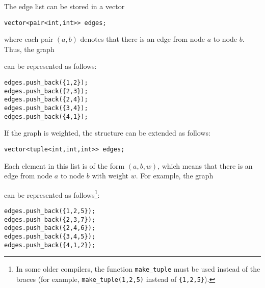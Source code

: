The edge list can be stored in a vector
\begin{lstlisting}
vector<pair<int,int>> edges;
\end{lstlisting}
where each pair $(a,b)$ denotes that
there is an edge from node $a$ to node $b$.
Thus, the graph

\begin{center}
\end{center}
can be represented as follows:
\begin{lstlisting}
edges.push_back({1,2});
edges.push_back({2,3});
edges.push_back({2,4});
edges.push_back({3,4});
edges.push_back({4,1});
\end{lstlisting}

\noindent
If the graph is weighted, the structure can
be extended as follows:
\begin{lstlisting}
vector<tuple<int,int,int>> edges;
\end{lstlisting}
Each element in this list is of the
form $(a,b,w)$, which means that there
is an edge from node $a$ to node $b$ with weight $w$.
For example, the graph

\begin{center}
\end{center}
\begin{samepage}
can be represented as follows\footnote{In some older compilers, the function
\texttt{make\_tuple} must be used instead of the braces (for example,
\texttt{make\_tuple(1,2,5)} instead of \texttt{\{1,2,5\}}).}:
\begin{lstlisting}
edges.push_back({1,2,5});
edges.push_back({2,3,7});
edges.push_back({2,4,6});
edges.push_back({3,4,5});
edges.push_back({4,1,2});
\end{lstlisting}
\end{samepage}
